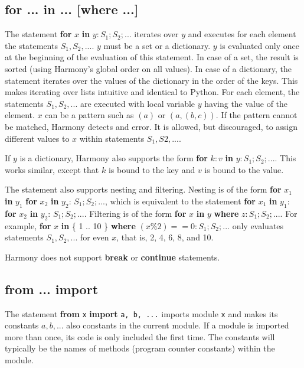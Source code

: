 \documentclass{report}
\begin{document}
\subsection*{\textbf{for ... in ... [where ...]}}

The statement \textbf{for} $x$ \textbf{in} $y: S_1; S_2; ...$
iterates over $y$ and executes for each element the statements
$S_1, S_2, ...$.
$y$ must be a set or a dictionary.  $y$ is evaluated only once at
the beginning of the evaluation of this statement.  In case of a set,
the result is sorted (using Harmony's global order on all values).
In case of a dictionary, the statement iterates over the values of
the dictionary in the order of the keys.  This makes iterating over
lists intuitive and identical to Python.
For each element, the statements $S_1, S_2, ...$ are executed with
local variable $y$ having the value of the element.
$x$ can be a pattern such as $(a)$ or $(a, (b, c))$.
If the pattern cannot be matched, Harmony detects and error.
It is allowed, but discouraged, to assign different values to $x$
within statements $S_1, S2, ...$.

If $y$ is a dictionary, Harmony also supports the form
\textbf{for} $k:v$ \textbf{in} $y: S_1; S_2; ...$.  This works similar,
except that $k$ is bound to the key and $v$ is bound to the value.

The statement also supports nesting and filtering.
Nesting is of the form
\textbf{for} $x_1$ \textbf{in} $y_1$ \textbf{for} $x_2$ \textbf{in} $y_2$:
$S_1; S_2; ...$,
which is equivalent to the statement
\textbf{for} $x_1$ \textbf{in} $y_1$: \textbf{for} $x_2$ \textbf{in} $y_2$:
$S_1; S_2; ...$.
Filtering is of the form
\textbf{for} $x$ \textbf{in} $y$ \textbf{where} $z: S_1; S_2; ...$.
For example,
\textbf{for} $x$ \textbf{in} \{ 1 .. 10 \} \textbf{where} $(x \% 2) == 0:
S_1; S_2; ...$ only evaluates statements $S_1, S_2, ...$ for even $x$,
that is, 2, 4, 6, 8, and 10.

Harmony does not support \textbf{break} or \textbf{continue} statements.

\subsection*{\textbf{from ... import}}

The statement \textbf{from} \texttt{x} \textbf{import} \texttt{a, b, ...}
imports module \texttt{x} and makes its constants $a, b, ...$ also constants
in the current module.  If a module is imported more than once, its code
is only included the first time.  The constants will typically be the
names of methods (program counter constants) within the module.
\end{document}
